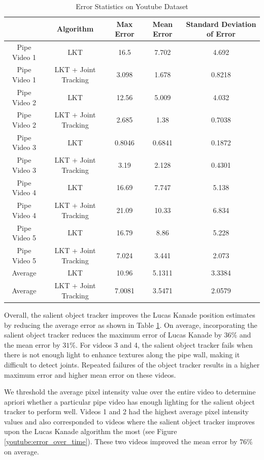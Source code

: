 \documentclass[letterpaper, 10 pt, conference]{ieeeconf}
\begin{document}
\begin{table}[tb] 
	\centering
	\footnotesize
	\setlength{\tabcolsep}{.5em}
	\caption{Error Statistics on Youtube Dataset}
	\label{table:youtube_results}
	\begin{tabular}{c|c|c|c|c|}
		\hline
		& Algorithm & Max Error & Mean Error & Standard Deviation of Error\\
		\hline
		Pipe Video 1 & LKT & 16.5 & 7.702 & 4.692 \\
		\rowcolor{Gray}
		Pipe Video 1 & LKT + Joint Tracking & 3.098 & 1.678 & 0.8218\\
		Pipe Video 2 & LKT & 12.56 & 5.009 & 4.032\\
		\rowcolor{Gray}
		Pipe Video 2 & LKT + Joint Tracking & 2.685 & 1.38 & 0.7038\\
		Pipe Video 3 & LKT & 0.8046 & 0.6841 & 0.1872 \\
		\rowcolor{Gray}
		Pipe Video 3 & LKT + Joint Tracking & 3.19 & 2.128 & 0.4301\\
		Pipe Video 4 & LKT & 16.69 & 7.747 & 5.138\\
		\rowcolor{Gray}
		Pipe Video 4 & LKT + Joint Tracking & 21.09 & 10.33 & 6.834\\
		Pipe Video 5 & LKT & 16.79 & 8.86 & 5.228 \\
		\rowcolor{Gray}
		Pipe Video 5 & LKT + Joint Tracking & 7.024 & 3.441 & 2.073\\
		\hline
		\hline
		Average  & LKT & 10.96 & 5.1311 & 3.3384 \\
		\rowcolor{Gray}
		Average & LKT + Joint Tracking & 7.0081 & 3.5471 & 2.0579\\
		\hline
	\end{tabular}
\end{table}


Overall, the salient object tracker improves the Lucas Kanade position estimates by reducing the average error as shown in Table \ref{table:youtube_results}. On average, incorporating the salient object tracker reduces the maximum error of Lucas Kanade by $36 \%$ and the mean error by $31 \%$. For videos 3 and 4, the salient object tracker fails when there is not enough light to enhance textures along the pipe wall, making it difficult to detect joints. Repeated failures of the object tracker results in a higher maximum error and higher mean error on these videos.


We threshold the average pixel intensity value over the entire video to determine apriori whether a particular pipe video has enough lighting for the salient object tracker to perform well. Videos 1 and 2 had the highest average pixel intensity values and also corresponded to videos where the salient object tracker improves upon the Lucas Kanade algorithm the most (see Figure \ref{youtube:error_over_time}). These two videos improved the mean error by $76 \%$ on average.
\end{document}

